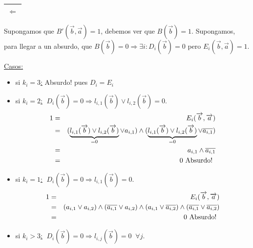 \documentclass[12pt,a4paper]{report}
\begin{document}
			\vspace{5mm}
			\begin{tabular}{|c|} \hline $\Leftarrow$ \\\hline \end{tabular}
				\par Supongamos que $B'(\overrightarrow{b}, \overrightarrow{a}) = 1$, debemos ver que $B(\overrightarrow{b}) = 1$. Supongamos, para llegar a un absurdo, que $B(\overrightarrow{b}) = 0 \Rightarrow \exists i : D_{i}(\overrightarrow{b}) = 0$ pero $E_{i}(\overrightarrow{b}, \overrightarrow{a}) = 1$.

				\vspace{3mm}
				\underline{Casos:}
					\begin{itemize}
						\item si \underline{$k_{i} = 3$:} Absurdo! pues $D_{i} = E_{i}$
						\item si \underline{$k_{i} = 2$:} $\; D_{i}(\overrightarrow{b}) = 0 \Rightarrow l_{i, 1}(\overrightarrow{b}) \vee l_{i, 2} (\overrightarrow{b}) = 0$.
							\begin{eqnarray}
								\nonumber 1 &=& E_{i}(\overrightarrow{b}, \overrightarrow{a}) \\
								\nonumber &=& (\underbrace{l_{i, 1}(\overrightarrow{b}) \vee l_{i, 2}(\overrightarrow{b})}_{= 0} \vee a_{i, 1}) \wedge (\underbrace{l_{i, 1}(\overrightarrow{b}) \vee l_{i, 2}(\overrightarrow{b})}_{= 0} \vee \overline{a_{i, 1}}) \\
								\nonumber &=& a_{i, 1} \wedge \overline{a_{i, 1}} \\
								\nonumber &=& 0 \textup{ Absurdo! }
							\end{eqnarray}
						\item si \underline{$k_{i} = 1$:} $\; D_{i}(\overrightarrow{b}) = 0 \Rightarrow l_{i, 1}(\overrightarrow{b}) = 0$.
							\begin{eqnarray}
								\nonumber 1 &=& E_{i}(\overrightarrow{b}, \overrightarrow{a}) \\
								\nonumber &=& (a_{i, 1} \vee a_{i, 2}) \wedge (\overline{a_{i, 1}} \vee a_{i, 2}) \wedge (a_{i, 1} \vee \overline{a_{i, 2}}) \wedge (\overline{a_{i, 1}} \vee \overline{a_{i, 2}}) \\
								\nonumber &=& 0 \textup{ Absurdo! }
							\end{eqnarray}
						\item si \underline{$k_{i} > 3$:} $\; D_{i}(\overrightarrow{b}) = 0 \Rightarrow l_{i, j}(\overrightarrow{b}) = 0 \; \; \forall j$.


\end{itemize}
\end{document}
